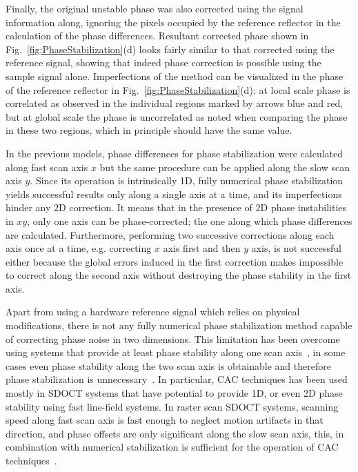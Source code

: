 Finally, the original unstable phase was also corrected using the signal information along, ignoring the pixels occupied by the reference reflector in the calculation of the phase differences. Resultant corrected phase shown in Fig.~\ref{fig:PhaseStabilization}(d) looks fairly similar to that corrected using the reference signal, showing that indeed phase correction is possible using the sample signal alone. Imperfections of the method can be visualized in the phase of the reference reflector in Fig.~\ref{fig:PhaseStabilization}(d): at local scale phase is correlated as observed in the individual regions marked by arrows blue and red, but at global scale the phase is uncorrelated as noted when comparing the phase in these two regions, which in  principle should have the same value.

In the previous models, phase differences for phase stabilization were calculated along fast scan axis $x$ but the same procedure can be applied along the slow scan axis $y$. Since its operation is intrinsically 1D, fully numerical phase stabilization yields successful results only along a single axis at a time, and its imperfections hinder any 2D correction. It means that in the presence of 2D phase instabilities in $xy$, only one axis can be phase-corrected; the one along which phase differences are calculated. Furthermore, performing two successive corrections along each axis once at a time, e.g. correcting $x$ axis first and then $y$ axis, is not successful either because the global errors induced in the first correction makes impossible to correct along the second axis without destroying the phase stability in the first axis.

Apart from using a hardware reference signal which relies on physical modifications, there is not any fully numerical phase stabilization method capable of correcting phase noise in two dimensions. This limitation has been overcome using systems that provide at least phase stability along one scan axis~\cite{Ginner2017_Noniterative, Shemonski2014_Threedimensional, Fechtig2015_Highspeed, Ginner2018_Holographic, Leitgeb2016_Digital,Yasuno2006_Noniterative, South2019_Local}, in some cases even phase stability along the two scan axis is obtainable and therefore phase stabilization is unnecessary~\cite{Kumar2013_Subaperture, Hillmann2016_Aberrationfree, Pande2016_Automated, Kumar2015_Anisotropic,Sudkamp2018_Simple}. In particular, CAC techniques has been used mostly in SDOCT systems that have potential to provide 1D, or even 2D phase stability using fast line-field systems. In raster scan SDOCT systems, scanning speed along fast scan axis is fast enough to neglect motion artifacts in that direction, and phase offsets are only significant along the slow scan axis, this, in combination with numerical stabilization is sufficient for the operation of CAC techniques~\cite{Shemonski2014_Threedimensional}.

